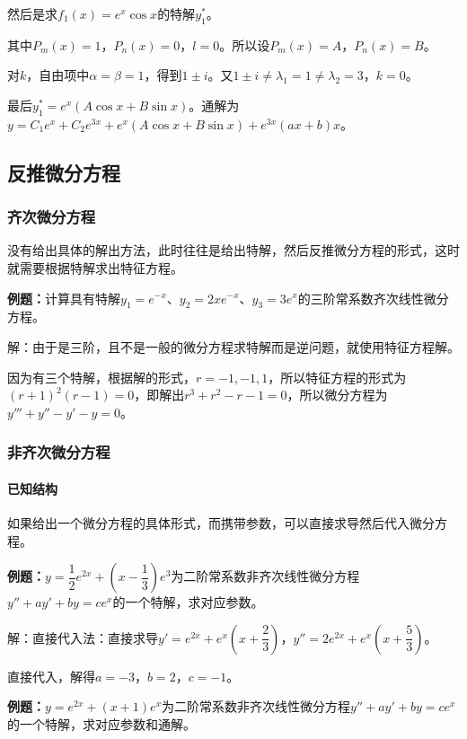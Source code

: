 \documentclass[UTF8, 12pt]{ctexart}
\begin{document}
然后是求$f_1(x)=e^x\cos x$的特解$y_1^*$。

其中$P_m(x)=1$，$P_n(x)=0$，$l=0$。所以设$P_m(x)=A$，$P_n(x)=B$。

对$k$，自由项中$\alpha=\beta=1$，得到$1\pm i$。又$1\pm i\neq\lambda_1=1\neq\lambda_2=3$，$k=0$。

最后$y_1^*=e^x(A\cos x+B\sin x)$。通解为$y=C_1e^x+C_2e^{3x}+e^x(A\cos x+B\sin x)+e^{3x}(ax+b)x$。

\subsection{反推微分方程}

\subsubsection{齐次微分方程}

没有给出具体的解出方法，此时往往是给出特解，然后反推微分方程的形式，这时就需要根据特解求出特征方程。

\textbf{例题：}计算具有特解$y_1=e^{-x}$、$y_2=2xe^{-x}$、$y_3=3e^x$的三阶常系数齐次线性微分方程。

解：由于是三阶，且不是一般的微分方程求特解而是逆问题，就使用特征方程解。

因为有三个特解，根据解的形式，$r=-1,-1,1$，所以特征方程的形式为$(r+1)^2(r-1)=0$，即解出$r^3+r^2-r-1=0$，所以微分方程为$y'''+y''-y'-y=0$。

\subsubsection{非齐次微分方程}

\paragraph{已知结构} \leavevmode \medskip

如果给出一个微分方程的具体形式，而携带参数，可以直接求导然后代入微分方程。

\textbf{例题：}$y=\dfrac{1}{2}e^{2x}+(x-\dfrac{1}{3})e^3$为二阶常系数非齐次线性微分方程$y''+ay'+by=ce^x$的一个特解，求对应参数。

解：直接代入法：直接求导$y'=e^{2x}+e^x(x+\dfrac{2}{3})$，$y''=2e^{2x}+e^x(x+\dfrac{5}{3})$。

直接代入，解得$a=-3$，$b=2$，$c=-1$。

\textbf{例题：}$y=e^{2x}+(x+1)e^x$为二阶常系数非齐次线性微分方程$y''+ay'+by=ce^x$的一个特解，求对应参数和通解。
\end{document}

